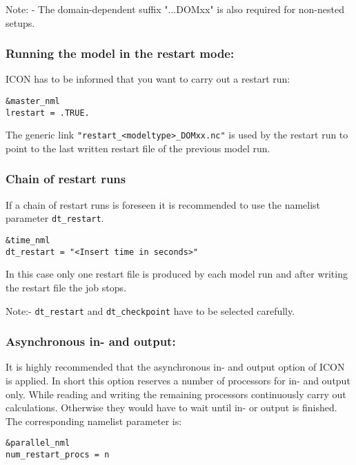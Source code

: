      
     
 
Note:
    -  The domain-dependent suffix "...DOMxx" is also required for 
non-nested setups.

    


\subsubsection{Running the model in the restart mode:}

ICON has to be informed that you want to carry out a restart run:

\begin{verbatim}
&master_nml
lrestart = .TRUE. 
\end{verbatim}

The generic link \verb+"restart_<modeltype>_DOMxx.nc"+ is used by the restart run to point to the last written restart file of the previous model run. 


\subsubsection*{Chain of restart runs}

If a chain of restart runs is foreseen it is recommended to use the namelist parameter
\verb+dt_restart+. 

\begin{verbatim}
&time_nml
dt_restart = "<Insert time in seconds>" 
\end{verbatim}


In this case only one restart file is produced by each model run and after writing the restart file the job stops.

Note:- \verb+dt_restart+ and \verb+dt_checkpoint+ have to be selected carefully. 
 


\subsubsection*{Asynchronous in- and  output:} 

It is highly recommended that the asynchronous in- and output option of ICON is applied. In short this option reserves a number of processors for in- and output only.  While reading and writing the remaining processors continuously carry out calculations. Otherwise they would have to wait until in- or output is finished. The corresponding namelist parameter is:

\begin{verbatim}
&parallel_nml
num_restart_procs = n
\end{verbatim} 

